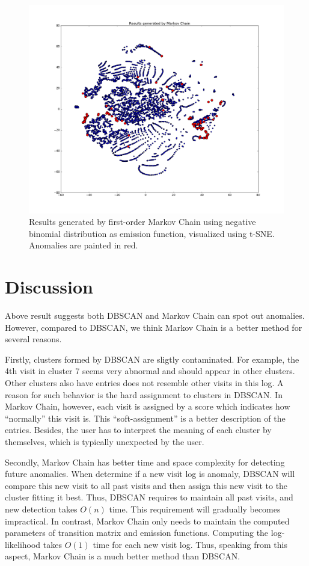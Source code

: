 \begin{figure}[!ht]
	\begin{center}
		\includegraphics[width=\textwidth]{images/MarkovResult}
		\caption{Results generated by first-order Markov Chain using negative binomial distribution as emission function, visualized using t-SNE. Anomalies are painted in red.}
		\label{fig:MarkovResult}
	\end{center}
\end{figure}

\section{Discussion}
\label{sec:discuss}
Above result suggests both DBSCAN and Markov Chain can spot out anomalies. However, compared to DBSCAN, we think Markov Chain is a better method for several reasons. 

Firstly, clusters formed by DBSCAN are sligtly contaminated. For example, the 4th visit in cluster 7 seems very abnormal and should appear in other clusters. Other clusters also have entries does not resemble other visits in this log. A reason for such behavior is the hard assignment to clusters in DBSCAN. In Markov Chain, however, each visit is assigned by a score which indicates how ``normally'' this visit is. This ``soft-assignment'' is a better description of the entries. Besides, the user has to interpret the meaning of each cluster by themselves, which is typically unexpected by the user.

Secondly, Markov Chain has better time and space complexity for detecting future anomalies. When determine if a new visit log is anomaly, DBSCAN will compare this new visit to all past visits and then assign this new visit to the cluster fitting it best. Thus, DBSCAN requires to maintain all past visits, and new detection takes $O(n)$ time. This requirement will gradually becomes impractical. In contrast, Markov Chain only needs to maintain the computed parameters of transition matrix and emission functions. Computing the log-likelihood takes $O(1)$ time for each new visit log. Thus, speaking from this aspect, Markov Chain is a much better method than DBSCAN.